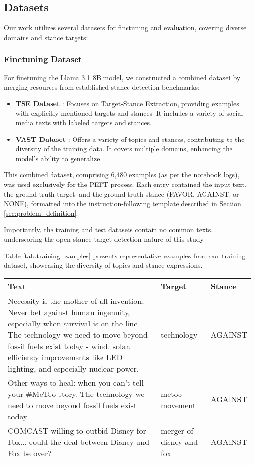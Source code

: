\documentclass[twocolumn,11pt,letterpaper]{article}
\begin{document}
\subsection{Datasets}
\label{sec:dataset}

Our work utilizes several datasets for finetuning and evaluation, covering diverse domains and stance targets:

\subsubsection{Finetuning Dataset}
For finetuning the Llama 3.1 8B model, we constructed a combined dataset by merging resources from established stance detection benchmarks:
\begin{itemize}
    \item \textbf{TSE Dataset} \cite{tse_data}: Focuses on Target-Stance Extraction, providing examples with explicitly mentioned targets and stances. It includes a variety of social media texts with labeled targets and stances.
    \item \textbf{VAST Dataset} \cite{vast_data}: Offers a variety of topics and stances, contributing to the diversity of the training data. It covers multiple domains, enhancing the model's ability to generalize.
\end{itemize}
This combined dataset, comprising 6,480 examples (as per the notebook logs), was used exclusively for the PEFT process. Each entry contained the input text, the ground truth target, and the ground truth stance (FAVOR, AGAINST, or NONE), formatted into the instruction-following template described in Section \ref{sec:problem_definition}.

Importantly, the training and test datasets contain no common texts, underscoring the open stance target detection nature of this study.

Table \ref{tab:training_samples} presents representative examples from our training dataset, showcasing the diversity of topics and stance expressions.

\begin{table*}[!htbp]
\centering
\caption{Sample Training Data Points}
\label{tab:training_samples}
\begin{tabular}{|p{}|p{}|p{}|}
\hline
\textbf{Text} & \textbf{Target} & \textbf{Stance} \\
\hline
Necessity is the mother of all invention. Never bet against human ingenuity, especially when survival is on the line. The technology we need to move beyond fossil fuels exist today - wind, solar, efficiency improvements like LED lighting, and especially nuclear power. & technology & AGAINST \\
\hline
Other ways to heal: when you can't tell your \#MeToo story. The technology we need to move beyond fossil fuels exist today. & metoo movement & AGAINST \\
\hline
COMCAST willing to outbid Disney for Fox... could the deal between Disney and Fox be over? & merger of disney and fox & AGAINST \\
\hline
\end{tabular}
\end{table*}
\end{document}
